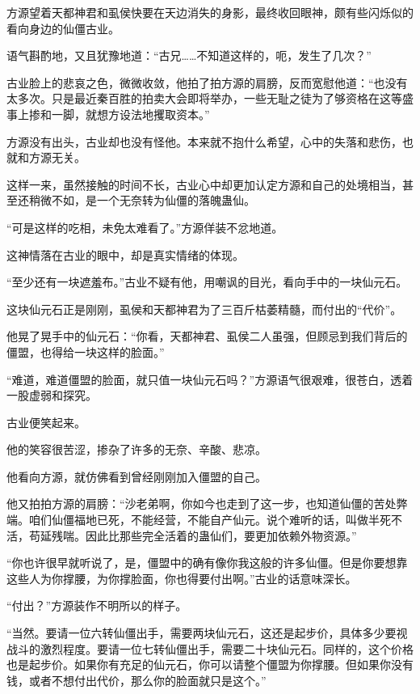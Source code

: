 
\begin{this_body}

方源望着天都神君和虱侯快要在天边消失的身影，最终收回眼神，颇有些闪烁似的看向身边的仙僵古业。

语气斟酌地，又且犹豫地道：“古兄……不知道这样的，呃，发生了几次？”

古业脸上的悲哀之色，微微收敛，他拍了拍方源的肩膀，反而宽慰他道：“也没有太多次。只是最近秦百胜的拍卖大会即将举办，一些无耻之徒为了够资格在这等盛事上掺和一脚，就想方设法地攫取资本。”

方源没有出头，古业却也没有怪他。本来就不抱什么希望，心中的失落和悲伤，也就和方源无关。

这样一来，虽然接触的时间不长，古业心中却更加认定方源和自己的处境相当，甚至还稍微不如，是一个无奈转为仙僵的落魄蛊仙。

“可是这样的吃相，未免太难看了。”方源佯装不忿地道。

这神情落在古业的眼中，却是真实情绪的体现。

“至少还有一块遮羞布。”古业不疑有他，用嘲讽的目光，看向手中的一块仙元石。

这块仙元石正是刚刚，虱侯和天都神君为了三百斤枯萎精髓，而付出的“代价”。

他晃了晃手中的仙元石：“你看，天都神君、虱侯二人虽强，但顾忌到我们背后的僵盟，也得给一块这样的脸面。”

“难道，难道僵盟的脸面，就只值一块仙元石吗？”方源语气很艰难，很苍白，透着一股虚弱和探究。

古业便笑起来。

他的笑容很苦涩，掺杂了许多的无奈、辛酸、悲凉。

他看向方源，就仿佛看到曾经刚刚加入僵盟的自己。

他又拍拍方源的肩膀：“沙老弟啊，你如今也走到了这一步，也知道仙僵的苦处弊端。咱们仙僵福地已死，不能经营，不能自产仙元。说个难听的话，叫做半死不活，苟延残喘。因此比那些完全活着的蛊仙们，要更加依赖外物资源。”

“你也许很早就听说了，是，僵盟中的确有像你我这般的许多仙僵。但是你要想靠这些人为你撑腰，为你撑脸面，你也得要付出啊。”古业的话意味深长。

“付出？”方源装作不明所以的样子。

“当然。要请一位六转仙僵出手，需要两块仙元石，这还是起步价，具体多少要视战斗的激烈程度。要请一位七转仙僵出手，需要二十块仙元石。同样的，这个价格也是起步价。如果你有充足的仙元石，你可以请整个僵盟为你撑腰。但如果你没有钱，或者不想付出代价，那么你的脸面就只是这个。”


\end{this_body}
